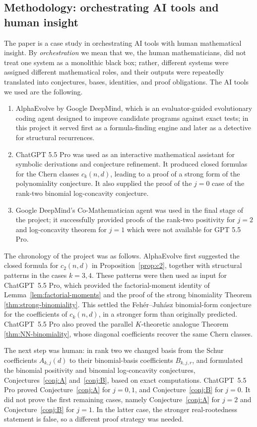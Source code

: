 \documentclass[11pt]{amsart}
\numberwithin{equation}{section}
\theoremstyle{remark}
\begin{document}
\subsection{Methodology: orchestrating AI tools and human insight} The paper is a case study in orchestrating AI tools with human mathematical insight.  By \emph{orchestration} we mean that we, the human mathematicians, did not treat one system as a monolithic black box; rather, different systems were assigned different mathematical roles, and their outputs were repeatedly translated into conjectures, bases, identities, and proof obligations. The AI tools we used are the following. 
\begin{enumerate}
    \item AlphaEvolve \cite{AlphaEvolve} by Google DeepMind, which is an evaluator-guided evolutionary coding agent designed to improve candidate programs against exact tests; in this project it served first as a formula-finding engine and later as a detective for structural recurrences.  
    \item  ChatGPT 5.5 Pro was used as an interactive mathematical assistant for symbolic derivations and conjecture refinement. It produced closed formulas for the Chern classes $c_k(n,d)$, leading to a proof of a strong form of the polynomiality conjecture. It also supplied the proof of the $j=0$ case of the rank-two binomial log-concavity conjecture.  
    \item Google DeepMind's Co-Mathematician agent \cite{co-math} was used in the final stage of the project; it successfully provided proofs of the rank-two positivity for $j=2$ and log-concavity theorem for $j=1$ which were not available for GPT 5.5 Pro.
\end{enumerate}

The chronology of the project was as follows.  AlphaEvolve first suggested
the closed formula for $c_2(n,d)$ in Proposition~\ref{prop:c2}, together
with structural patterns in the cases $k=3,4$.  These patterns were then
used as input for ChatGPT~5.5 Pro, which provided the factorial-moment
identity of Lemma~\ref{lem:factorial-moments} and the proof of the strong
binomiality Theorem \ref{thm:strong-binomiality}. This settled the Feh\'er--Juh\'asz binomial-form
conjecture for the coefficients of $c_k(n,d)$, in a stronger form than
originally predicted.  ChatGPT~5.5 Pro also proved the parallel
$K$-theoretic analogue Theorem \ref{thm:NN-binomiality}, whose diagonal coefficients recover the
same Chern classes.

The next step was human: in rank two we changed basis from the Schur
coefficients $A_{k,j}(d)$ to their binomial-basis coefficients
$B_{k,j,r}$, and formulated the binomial positivity and binomial
log-concavity conjectures, Conjectures~\ref{conj:A} and~\ref{conj:B},
based on exact computations.  ChatGPT~5.5 Pro proved
Conjecture~\ref{conj:A} for $j=0,1$, and
Conjecture~\ref{conj:B} for $j=0$.  It did not prove the first remaining
cases, namely Conjecture~\ref{conj:A} for $j=2$ and
Conjecture~\ref{conj:B} for $j=1$.  In the latter case, the stronger
real-rootedness statement is false, so a different proof strategy was
needed.
\end{document}
